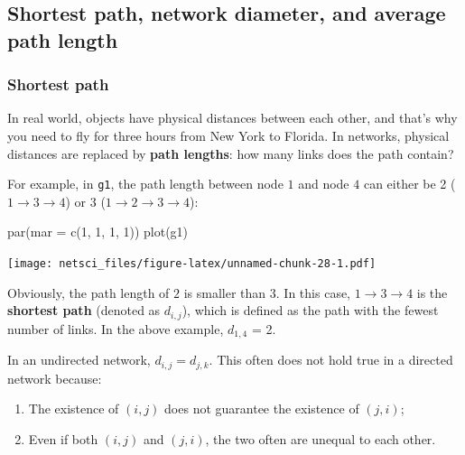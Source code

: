\documentclass[
]{krantz}
\makeatletter
\newenvironment{Shaded}{\begin{snugshade}}{\end{snugshade}}
\newcommand{\AttributeTok}[1]{\textcolor[rgb]{0.61,0.61,0.61}{#1}}
\newcommand{\DecValTok}[1]{\textcolor[rgb]{0.06,0.06,0.06}{#1}}
\newcommand{\FunctionTok}[1]{\textcolor[rgb]{0,0,0}{#1}}
\newcommand{\NormalTok}[1]{#1}
\newenvironment{kframe}{%
\medskip{}
\setlength{\fboxsep}{.8em}
 \def\at@end@of@kframe{}%
 \ifinner\ifhmode%
  \def\at@end@of@kframe{\end{minipage}}%
  \begin{minipage}{\columnwidth}%
 \fi\fi%
 \def\FrameCommand##1{\hskip\@totalleftmargin \hskip-\fboxsep
 \colorbox{shadecolor}{##1}\hskip-\fboxsep
     \hskip-\linewidth \hskip-\@totalleftmargin \hskip\columnwidth}%
 \MakeFramed {\advance\hsize-\width
   \@totalleftmargin\z@ \linewidth\hsize
   \@setminipage}}%
 {\par\unskip\endMakeFramed%
 \at@end@of@kframe}
\renewenvironment{Shaded}{\begin{kframe}}{\end{kframe}}
\makeatother
\begin{document}
\hypertarget{shortest-path-network-diameter-and-average-path-length}{%
\subsection{Shortest path, network diameter, and average path length}\label{shortest-path-network-diameter-and-average-path-length}}

\hypertarget{shortest-path}{%
\subsubsection{Shortest path}\label{shortest-path}}

In real world, objects have physical distances between each other, and that's why you need to fly for three hours from New York to Florida. In networks, physical distances are replaced by \textbf{path lengths}: how many links does the path contain?

For example, in \texttt{g1}, the path length between node \(1\) and node \(4\) can either be 2 (\(1 \to 3 \to 4\)) or 3 (\(1 \to 2 \to 3 \to 4\)):

\begin{Shaded}
\begin{Highlighting}[]
\FunctionTok{par}\NormalTok{(}\AttributeTok{mar =} \FunctionTok{c}\NormalTok{(}\DecValTok{1}\NormalTok{, }\DecValTok{1}\NormalTok{, }\DecValTok{1}\NormalTok{, }\DecValTok{1}\NormalTok{))}
\FunctionTok{plot}\NormalTok{(g1)}
\end{Highlighting}
\end{Shaded}

\texttt{[image: netsci\_files/figure-latex/unnamed-chunk-28-1.pdf]}

Obviously, the path length of \(2\) is smaller than \(3\). In this case, \(1 \to 3 \to 4\) is the \textbf{shortest path} (denoted as \(d_{i,j}\)), which is defined as the path with the fewest number of links. In the above example, \(d_{1,4}\) = 2.

In an undirected network, \(d_{i,j} = d_{j,k}\). This often does not hold true in a directed network because:

\begin{enumerate}
\def\labelenumi{\arabic{enumi}.}
\item
  The existence of \((i, j)\) does not guarantee the existence of \((j, i)\);
\item
  Even if both \((i, j)\) and \((j, i)\), the two often are unequal to each other.
\end{enumerate}
\end{document}
